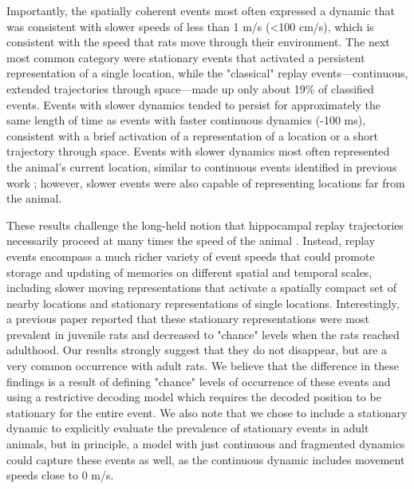 \documentclass[9pt,lineno]{elife}
\begin{document}
Importantly, the spatially coherent events most often expressed a dynamic that was consistent with slower speeds of less than 1 m/s (<100 cm/s), which is consistent with the speed that rats move through their environment. The next most common category were stationary events \citep{YuDistincthippocampalcorticalmemory2017, FarooqEmergencepreconfiguredplastic2019} that activated a persistent representation of a single location, while the "classical" replay events---continuous, extended trajectories through space---made up only about 19\% of classified events. Events with slower dynamics tended to persist for approximately the same length of time as events  with faster continuous dynamics (-100 ms), consistent with a brief activation of a representation of a location or a short trajectory through space. Events with slower dynamics most often represented the animal's current location, similar to continuous events identified in previous work \citep{DavidsonHippocampalReplayExtended2009, KarlssonAwakereplayremote2009}; however, slower events were also capable of representing locations far from the animal.

These results challenge the long-held notion that hippocampal replay trajectories necessarily proceed at many times the speed of the animal \citep{NadasdyReplayTimeCompression1999, LeeMemorySequentialExperience2002, DavidsonHippocampalReplayExtended2009}. Instead, replay events encompass a much richer variety of event speeds that could promote storage and updating of memories on different spatial and temporal scales, including slower moving representations that activate a spatially compact set of nearby locations and stationary representations of single locations. Interestingly, a previous paper \citep{FarooqEmergencepreconfiguredplastic2019} reported that these stationary representations were most prevalent in juvenile rats and decreased to "chance" levels when the rats reached adulthood. Our results strongly suggest that they do not disappear, but are a very common occurrence with adult rats. We believe that the difference in these findings is a result of defining "chance" levels of occurrence of these events and using a restrictive decoding model which requires the decoded position to be stationary for the entire event. We also note that we chose to include a stationary dynamic to explicitly evaluate the prevalence of stationary events in adult animals, but in principle, a model with just continuous and fragmented dynamics could capture these events as well, as the continuous dynamic includes movement speeds close to 0 m/s.
\end{document}
